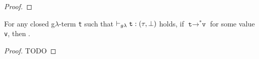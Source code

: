\begin{proof}
%
%
 

\end{proof}

\begin{lemma}
	For any closed g$\lambda$-term \texttt{t} such that
	$\vdash_{g\lambda} \texttt{t} : (\tau, \bot)$ holds, 
	if	$\texttt{t} \rightarrow^{\ast} \texttt{v}$ for some value \texttt{v}, then
	 . 
\end{lemma}
\begin{proof}
\hspace*{5cm}TODO
\end{proof}
